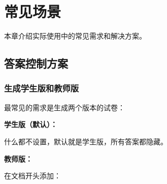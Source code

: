 
\section{常见场景}

本章介绍实际使用中的常见需求和解决方案。

\subsection{答案控制方案}

\subsubsection{生成学生版和教师版}

最常见的需求是生成两个版本的试卷：

\textbf{学生版（默认）：}

什么都不设置，默认就是学生版，所有答案都隐藏。

\textbf{教师版：}

在文档开头添加：

\begin{latexcode}
\end{latexcode}

